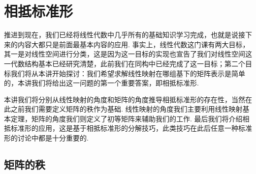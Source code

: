 \chapter{相抵标准形}

推进到现在，我们已经将线性代数中几乎所有的基础知识学习完成，也就是说接下来的内容大都只是前面最基本内容的应用. 事实上，线性代数这门课有两大目标，其一是对线性空间进行分类，这是因为这一目标的实现也宣告了我们对线性空间这一代数结构基本已经研究清楚，此前我们在同构中已经完成了这一目标；第二个目标我们将从本讲开始探讨：我们希望求解线性映射在哪组基下的矩阵表示是简单的，本讲我们将给出这一问题的第一个重要答案，即相抵标准形.

本讲我们将分别从线性映射的角度和矩阵的角度推导相抵标准形的存在性，当然在此之前我们需要定义矩阵的秩作为基础. 线性映射的角度我们主要利用线性映射基本定理，矩阵的角度我们则定义了初等矩阵来辅助我们的工作. 最后我们将介绍相抵标准形的应用，这是基于相抵标准形的分解技巧，此类技巧在此后任意一种标准形的讨论中都是十分重要的.

\section{矩阵的秩}

